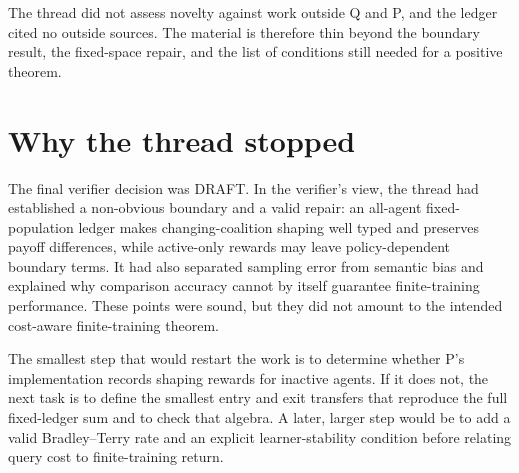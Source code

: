 \documentclass{article}
\begin{document}
The thread did not assess novelty against work outside Q and P, and the ledger cited no outside sources. The material is therefore thin beyond the boundary result, the fixed-space repair, and the list of conditions still needed for a positive theorem.

\section{Why the thread stopped}

The final verifier decision was DRAFT. In the verifier's view, the thread had established a non-obvious boundary and a valid repair: an all-agent fixed-population ledger makes changing-coalition shaping well typed and preserves payoff differences, while active-only rewards may leave policy-dependent boundary terms. It had also separated sampling error from semantic bias and explained why comparison accuracy cannot by itself guarantee finite-training performance. These points were sound, but they did not amount to the intended cost-aware finite-training theorem.

The smallest step that would restart the work is to determine whether P's implementation records shaping rewards for inactive agents. If it does not, the next task is to define the smallest entry and exit transfers that reproduce the full fixed-ledger sum and to check that algebra. A later, larger step would be to add a valid Bradley--Terry rate and an explicit learner-stability condition before relating query cost to finite-training return.



\end{document}
